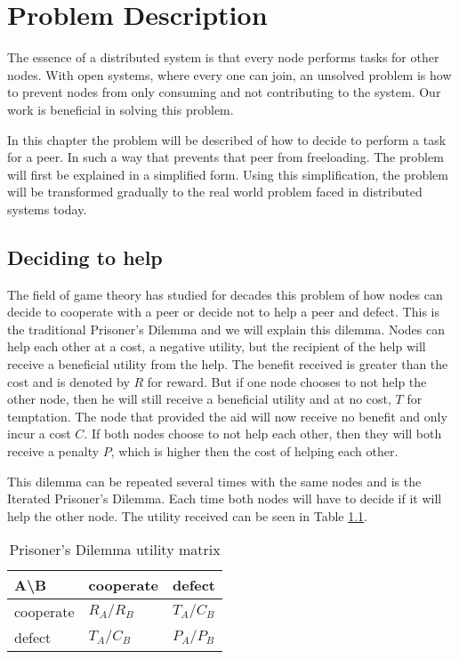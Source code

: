 \chapter{Problem Description}
The essence of a distributed system is that every node performs tasks for other nodes.
With open systems, where every one can join, an unsolved problem is how to prevent nodes
from only consuming and not contributing to the system.
Our work is beneficial in solving this problem.

In this chapter the problem will be described of how to decide to perform a task for a peer.
In such a way that prevents that peer from freeloading.
The problem will first be explained in a simplified form.
Using this simplification, the problem will be transformed gradually
to the real world problem faced in distributed systems today.

\section{Deciding to help}
The field of game theory has studied for decades this problem of how
nodes can decide to cooperate with a peer or decide not to help a peer and defect.
This is the traditional Prisoner's Dilemma 
and we will explain this dilemma\cite{Nowak-PrisonerDilemma}\cite{Lai-Incentives}.
Nodes can help each other at a cost, a negative utility, 
but the recipient of the help will receive a beneficial utility from the help.
The benefit received is greater than the cost and is denoted by $R$ for reward.
But if one node chooses to not help the other node,
 then he will still receive a beneficial utility and at no cost, $T$ for temptation.
The node that provided the aid will now receive no benefit and only incur a cost $C$.
If both nodes choose to not help each other, 
then they will both receive a penalty $P$, which is higher then the cost of helping each other.

This dilemma can be repeated several times with the same nodes and is the Iterated Prisoner's Dilemma.
Each time both nodes will have to decide if it will help the other node.
The utility received can be seen in Table \ref{tab:pd-um}.

\begin{table}
\center
	\begin{tabular}{l|ll}
	A\textbackslash B       & cooperate  & defect     \\ \hline
	cooperate & $R_A /R_B$ & $T_A /C_B$ \\
	defect    & $T_A /C_B$ & $P_A /P_B$
	\end{tabular}
\caption{Prisoner's Dilemma utility matrix}
\label{tab:pd-um}
\end{table}

